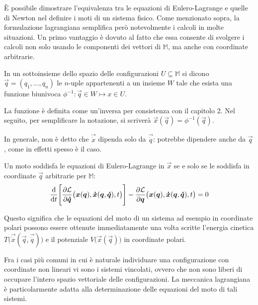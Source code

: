 È possibile dimostrare l'equivalenza tra le equazioni di Eulero-Lagrange e quelle di Newton nel definire i moti di un sistema fisico. Come menzionato sopra, la formulazione lagrangiana semplifica però notevolmente i calcoli in molte situazioni. Un primo vantaggio è dovuto al fatto che essa consente di svolgere i calcoli non solo usando le componenti dei vettori di $\mathbb{M}$, ma anche con coordinate arbitrarie.

\begin{definition} \label{def:coordinates}
  In un sottoinsieme dello spazio delle configurazioni $U \subseteq \mathbb{M}$ si dicono  $\vec{q}=(q_1, \ldots, q_n)$ le $n$-uple appartenenti a un insieme $W$ tale che esista una funzione biunivoca $\phi^{-1}: \vec{q} \in W \mapsto x\in U$. 
\end{definition}
\begin{remark}
  La funzione è definita come un'inversa per consistenza con il capitolo 2. Nel seguito, per semplificare la notazione, si scriverà $\vec{x}(\vec{q}) = \phi^{-1}(\vec{q})$. 
\end{remark}
\begin{remark}
  In generale, non è detto che $\vec{\dot{x}}$ dipenda solo da $\vec{\dot{q}}$: potrebbe dipendere anche da $\vec{q}$, come in effetti spesso è il caso.
\end{remark}
\begin{theorem}
  Un moto soddisfa le equazioni di Eulero-Lagrange in $\vec{x}$ se e solo se le soddisfa in coordinate $\vec{q}$ arbitrarie per $\mathbb{M}$: \begin{equation}
    \dv{t}\Bigg[\pdv{\mathcal{L}}{\boldsymbol{\dot{q}}}()\big(\boldsymbol{x}(\boldsymbol{q}), \boldsymbol{\dot{x}}(\boldsymbol{q},\boldsymbol{\dot{q}}), t\big)\Bigg] - \pdv{\mathcal{L}}{\boldsymbol{q}}()\big(\boldsymbol{x}(\boldsymbol{q}), \boldsymbol{\dot{x}}(\boldsymbol{q},\boldsymbol{\dot{q}}), t\big) = 0
  \end{equation} 
\end{theorem}

Questo significa che le equazioni del moto di un sistema ad esempio in coordinate polari possono essere ottenute immediatamente una volta scritte l'energia cinetica $T\big(\vec{\dot{x}}(\vec{q},\vec{\dot{q}})\big)$ e il potenziale $V\big(\vec{x}(\vec{q})\big)$ in coordinate polari.

Fra i casi più comuni in cui è naturale individuare una configurazione con coordinate non lineari vi sono i sistemi vincolati, ovvero che non sono liberi di occupare l'intero spazio vettoriale delle configurazioni. La meccanica lagrangiana è particolarmente adatta alla determinazione delle equazioni del moto di tali sistemi.

